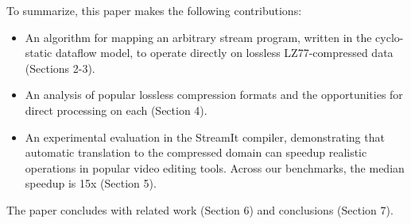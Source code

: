 To summarize, this paper makes the following contributions:
\begin{itemize}

\item An algorithm for mapping an arbitrary stream program, written in
  the cyclo-static dataflow model, to operate directly on lossless
  LZ77-compressed data (Sections 2-3).

\item An analysis of popular lossless compression formats and the
opportunities for direct processing on each (Section 4).

\item An experimental evaluation in the StreamIt compiler,
  demonstrating that automatic translation to the compressed domain
  can speedup realistic operations in popular video editing tools.
  Across our benchmarks, the median speedup is 15x (Section 5).

\end{itemize}

The paper concludes with related work (Section 6) and conclusions
(Section 7).
